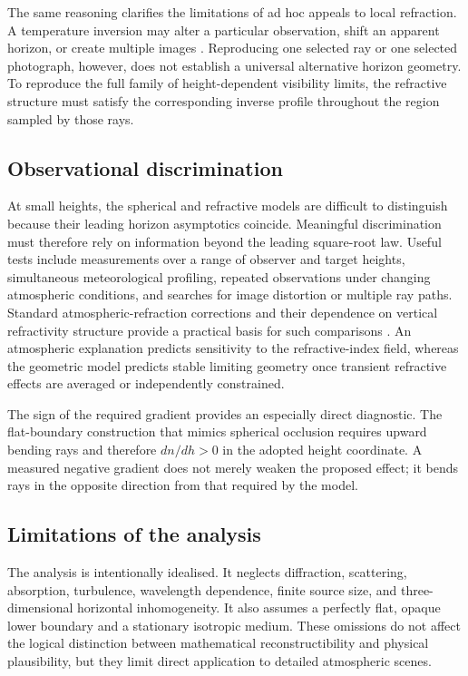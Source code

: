 The same reasoning clarifies the limitations of ad hoc appeals to local
refraction. A temperature inversion may alter a particular observation, shift
an apparent horizon, or create multiple images
\cite{bean1966radio,itur2019p453,nener2003analytical}. Reproducing one selected ray or one selected photograph, however, does not
establish a universal
alternative horizon geometry. To reproduce the full family of
height-dependent visibility limits, the refractive structure must satisfy the
corresponding inverse profile throughout the region sampled by those rays.

\subsection{Observational discrimination}

At small heights, the spherical and refractive models are difficult to
distinguish because their leading horizon asymptotics coincide. Meaningful
discrimination must therefore rely on information beyond the leading
square-root law. Useful tests include measurements over a range of observer
and target heights, simultaneous meteorological profiling, repeated
observations under changing atmospheric conditions, and searches for image
distortion or multiple ray paths. Standard atmospheric-refraction corrections
and their dependence on vertical refractivity structure provide a practical
basis for such comparisons
\cite{holleman2013analytical,bean1966radio,itur2019p453}. An atmospheric explanation predicts sensitivity to the refractive-index field, whereas the geometric model predicts
stable limiting geometry once transient refractive effects are averaged or
independently constrained.

The sign of the required gradient provides an especially direct diagnostic.
The flat-boundary construction that mimics spherical occlusion requires upward
bending rays and therefore $dn/dh>0$ in the adopted height coordinate. A
measured negative gradient does not merely weaken the proposed effect; it bends
rays in the opposite direction from that required by the model.

\subsection{Limitations of the analysis}

The analysis is intentionally idealised. It neglects diffraction, scattering,
absorption, turbulence, wavelength dependence, finite source size, and
three-dimensional horizontal inhomogeneity. It also assumes a perfectly flat,
opaque lower boundary and a stationary isotropic medium. These omissions do
not affect the logical distinction between mathematical reconstructibility and
physical plausibility, but they limit direct application to detailed
atmospheric scenes.

